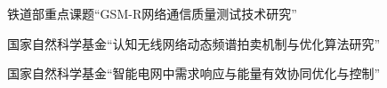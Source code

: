 
\begin{projects}{99}

    \item 铁道部重点课题“GSM-R网络通信质量测试技术研究”
    \item 国家自然科学基金“认知无线网络动态频谱拍卖机制与优化算法研究”
    \item 国家自然科学基金“智能电网中需求响应与能量有效协同优化与控制”

\end{projects}
